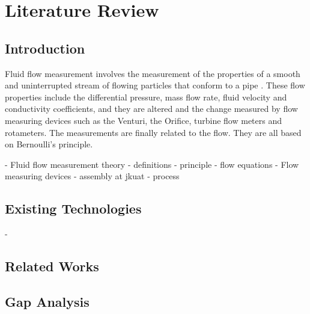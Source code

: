 \section{Literature Review}
\label{sec:review}
\subsection{Introduction}
Fluid flow measurement involves the measurement of the properties of a smooth and uninterrupted stream of flowing particles that conform to a pipe \cite{lanasa2014fluid}. These flow properties include the differential pressure, mass flow rate, fluid velocity and conductivity coefficients, and they are altered and the change measured by flow measuring devices such as the Venturi, the Orifice, turbine flow meters and rotameters. The measurements are finally related to the flow. They are all based on Bernoulli's principle. 

- Fluid flow measurement theory
    - definitions
    - principle
    - flow equations
- Flow measuring devices
    - assembly at jkuat 
    - process
\subsection{Existing Technologies}
- 
\subsection{Related Works}
\subsection{Gap Analysis}

